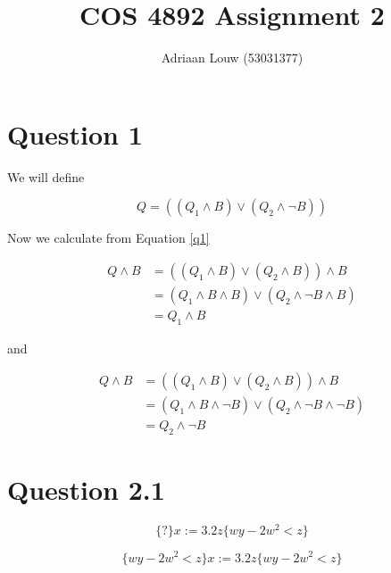 \documentclass[10pt,a4paper]{article}
\title{COS 4892 Assignment 2}
\author{Adriaan Louw (53031377)}
\begin{document}
\maketitle

\section{Question 1}

We will define

\begin{equation}
\label{q1}
Q = ((Q_1 \wedge B) \vee (Q_2 \wedge \neg B))
\end{equation}

Now we calculate from Equation \ref{q1}

\begin{equation}
\begin{split}
 Q\wedge B &= ((Q_1\wedge B)\vee(Q_2\wedge B))\wedge B\\
 &= (Q_1\wedge B \wedge B)\vee (Q_2\wedge \neg B \wedge B)\\
 &= Q_1\wedge B
 \end{split}
\end{equation}

and

\begin{equation}
\begin{split}
 Q\wedge B &= ((Q_1\wedge B)\vee(Q_2\wedge B))\wedge B\\
 &= (Q_1\wedge B \wedge \neg B)\vee (Q_2\wedge \neg B \wedge \neg B)\\
 &= Q_2\wedge \neg B
 \end{split}
\end{equation}

















\section{Question 2.1}

\begin{equation}
\{?\} x:=3.2z\{wy-2w^2<z\} 
\end{equation}

\begin{equation}
\{wy-2w^2<z\}  x:=3.2z\{wy-2w^2<z\} 
\end{equation}
\end{document}
